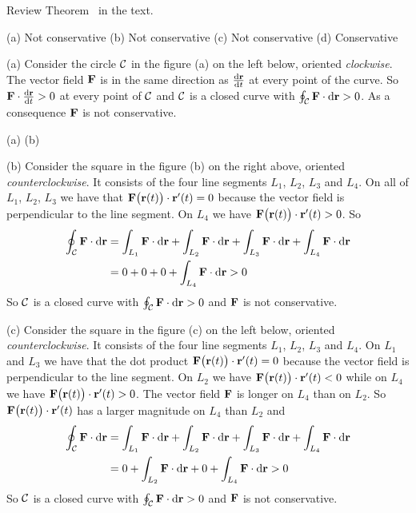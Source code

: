 \begin{hint} 
Review Theorem~ in the text.
\end{hint}

\begin{answer} 
(a) Not conservative \quad
(b) Not conservative \quad
(c) Not conservative \quad
(d) Conservative 
\end{answer}

\begin{solution} 
(a) Consider the circle $\mathcal{C}$ in the figure (a) on the left below,
oriented {\it clockwise}. The vector field $\mathbf{F}$ is in the same
direction as $\diff{\vr}{t}$ at every point of the curve. 
So $\vF\cdot\diff{\vr}{t}>0$ at every point of $\mathcal{C}$ and
$\mathcal{C}$ is a closed curve with $\oint_{\mathcal{C}}\mathbf{F}\cdot \mathrm{d}\mathbf{r}>0$.
As a consequence  $\mathbf{F}$ is not conservative. 
\begin{center}
      (a) \qquad
      (b) \qquad
\end{center}
\smallskip
(b) Consider the square in the figure (b) on the right above,
oriented {\it counterclockwise}. It consists of the four line
segments $L_1$, $L_2$, $L_3$ and $L_4$. On all of $L_1$, $L_2$, $L_3$
we have that $\mathbf{F}\big(\mathbf{r}(t)\big)\cdot\mathbf{r}'(t)=0$ because the vector
field is perpendicular to the line segment. On  $L_4$
we have $\mathbf{F}\big(\mathbf{r}(t)\big)\cdot\mathbf{r}'(t)>0$. So
\begin{align*}
\oint_{\mathcal{C}}\mathbf{F}\cdot \mathrm{d}\mathbf{r} &= \int_{L_1}\mathbf{F}\cdot \mathrm{d}\mathbf{r}
                         +\int_{L_2}\mathbf{F}\cdot \mathrm{d}\mathbf{r}
                         +\int_{L_3}\mathbf{F}\cdot \mathrm{d}\mathbf{r}
                         +\int_{L_4}\mathbf{F}\cdot \mathrm{d}\mathbf{r} \\
                         & =0+0+0+\int_{L_4}\mathbf{F}\cdot \mathrm{d}\mathbf{r}>0
\end{align*}
So $\mathcal{C}$ is a closed curve with $\oint_{\mathcal{C}}\mathbf{F}\cdot \mathrm{d}\mathbf{r}>0$
and  $\mathbf{F}$ is not conservative.


(c) Consider the square in the figure (c) on the left below,
oriented {\it counterclockwise}. It consists of the four line
segments $L_1$, $L_2$, $L_3$ and $L_4$. On $L_1$ and $L_3$
we have that the dot product $\mathbf{F}\big(\mathbf{r}(t)\big)\cdot\mathbf{r}'(t)=0$ because the vector
field is perpendicular to the line segment. On  $L_2$
we have $\mathbf{F}\big(\mathbf{r}(t)\big)\cdot\mathbf{r}'(t)<0$ while on  $L_4$
we have $\mathbf{F}\big(\mathbf{r}(t)\big)\cdot\mathbf{r}'(t)>0$. The vector field
$\mathbf{F}$ is longer on $L_4$ than on $L_2$. So 
$\mathbf{F}\big(\mathbf{r}(t)\big)\cdot\mathbf{r}'(t)$ has a larger magnitude on $L_4$
than $L_2$ and
\begin{align*}
\oint_{\mathcal{C}}\mathbf{F}\cdot \mathrm{d}\mathbf{r} &= \int_{L_1}\mathbf{F}\cdot \mathrm{d}\mathbf{r}
                         +\int_{L_2}\mathbf{F}\cdot \mathrm{d}\mathbf{r}
                         +\int_{L_3}\mathbf{F}\cdot \mathrm{d}\mathbf{r}
                         +\int_{L_4}\mathbf{F}\cdot \mathrm{d}\mathbf{r} \\
                         & =0+\int_{L_2}\mathbf{F}\cdot \mathrm{d}\mathbf{r}+0
                           +\int_{L_4}\mathbf{F}\cdot \mathrm{d}\mathbf{r}>0
\end{align*}
So $\mathcal{C}$ is a closed curve with $\oint_{\mathcal{C}}\mathbf{F}\cdot \mathrm{d}\mathbf{r}>0$
and  $\mathbf{F}$ is not conservative.


\end{solution}

